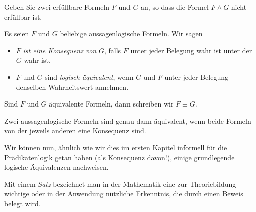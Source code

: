 \begin{ueb}
    Geben Sie zwei erfüllbare Formeln $F$ und $G$ an, so dass die Formel $F\land G$ nicht erfüllbar ist.
\end{ueb}
\begin{lsg}
\end{lsg}

\begin{df}
    Es seien $F$ und $G$ beliebige aussagenlogische Formeln. Wir sagen
    \begin{itemize}
        \item $F$ \textit{ist eine Konsequenz von }$G$, falls $F$ unter jeder Belegung wahr ist unter der $G$ wahr ist.
        \item $F$ und $G$ sind \textit{logisch äquivalent}, wenn $G$ und $F$ unter jeder Belegung denselben Wahrheitswert annehmen.
    \end{itemize}
    Sind $F$ und $G$ äquivalente Formeln, dann schreiben wir $F\equiv G$.
\end{df}

\begin{rk}
    Zwei aussagenlogische Formeln sind genau dann äquivalent, wenn beide Formeln von der jeweils anderen eine Konsequenz sind.
\end{rk}


Wir können nun, ähnlich wie wir dies im ersten Kapitel informell für die Prädikatenlogik getan haben (als Konsequenz davon!), einige grundlegende logische Äquivalenzen nachweisen.

\begin{rk}
    Mit einem \textit{Satz} bezeichnet man in der Mathematik eine zur Theoriebildung wichtige oder in der Anwendung nützliche Erkenntnis, die durch einen Beweis belegt wird.
\end{rk}

